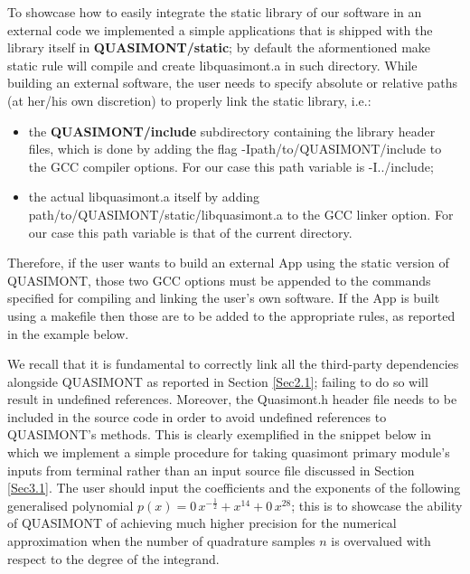 \documentclass[a4paper, twosided]{book}
\begin{document}
\noindent
To showcase how to easily integrate the static library of our software in an external code we implemented a simple applications that is shipped with the library itself in \colorbox{poliGrayBlue}{\textbf{QUASIMONT/static}}; by default the aformentioned \colorbox{poliGrayBlue}{make static} rule will compile and create \colorbox{poliGrayBlue}{libquasimont.a} in such directory. While building an external software, the user needs to specify absolute or relative paths (at her/his own discretion) to properly link the static library, i.e.:
\begin{itemize}
    \item the \colorbox{poliGrayBlue}{\textbf{QUASIMONT/include}} subdirectory containing the library header files, which is done by adding the flag \colorbox{poliGrayBlue}{-Ipath/to/QUASIMONT/include} to the GCC compiler options. For our case this path variable is \colorbox{poliGrayBlue}{-I../include};
    \item the actual \colorbox{poliGrayBlue}{libquasimont.a} itself by adding \colorbox{poliGrayBlue}{path/to/QUASIMONT/static/libquasimont.a} to the GCC linker option. For our case this path variable is that of the current directory.
\end{itemize}

\noindent
Therefore, if the user wants to build an external \colorbox{poliGrayBlue}{App} using the static version of QUASIMONT, those two GCC options must be appended to the commands specified for compiling and linking the user's own software. If the \colorbox{poliGrayBlue}{App} is built using a \colorbox{poliGrayBlue}{makefile} then those are to be added to the appropriate rules, as reported in the example below. 

\vspace{0.2cm}
\vspace{0.3cm}

\noindent
We recall that it is fundamental to correctly link all the third-party dependencies alongside QUASIMONT as reported in Section \ref{Sec2.1}; failing to do so will result in undefined references. Moreover, the \colorbox{poliGrayBlue}{Quasimont.h} header file needs to be included in the source code in order to avoid undefined references to QUASIMONT's methods. This is clearly exemplified in the snippet below in which we implement a simple procedure for taking \colorbox{poliGrayBlue}{quasimont} primary module's inputs from terminal rather than an input source file discussed in Section \ref{Sec3.1}. The user should input the coefficients and the exponents of the following generalised polynomial $p(x) = 0\,x^{-\frac{1}{2}} + x^{14} + 0\,x^{28}$; this is to showcase the ability of QUASIMONT of achieving much higher precision for the numerical approximation when the number of quadrature samples $n$ is overvalued with respect to the degree of the integrand.
\end{document}

